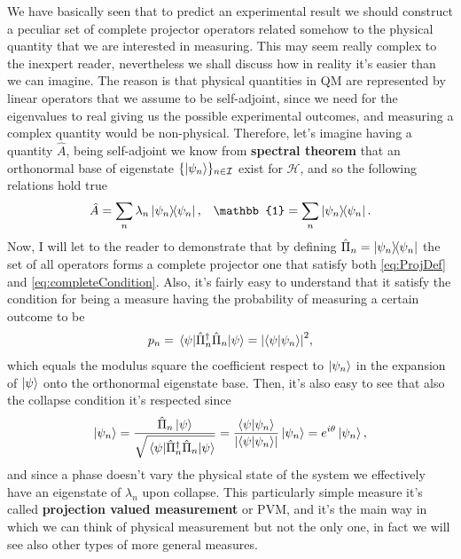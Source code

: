 We have basically seen that to predict an experimental result we should construct a peculiar set of complete projector operators related somehow to the physical quantity that we are interested in measuring. This may seem really complex to the inexpert reader, nevertheless we shall discuss how in reality it's easier than we can imagine. The reason is that physical quantities in QM are represented by linear operators that we assume to be self-adjoint, since we need for the eigenvalues to real giving us the possible experimental outcomes, and measuring a complex quantity would be non-physical. Therefore, let's imagine having a quantity $\hat{A}$, being self-adjoint we know from \textbf{spectral theorem} that an orthonormal base of eigenstate $\{ \ket{\psi_n} \}_{n\in \mathcal{I}}$ exist for $\mathcal{H}$, and so the following relations hold true
\begin{align}
    &\hat{A} = \sum_n \lambda_n\ketbra{\psi_n}{\psi_n}, &\mathbb{1} = \sum_n\ketbra{\psi_n}{\psi_n}.
\end{align}
Now, I will let to the reader to demonstrate that by defining $\hat{\Pi}_n = \ketbra{\psi_n}{\psi_n}$ the set of all operators forms a complete projector one that satisfy both \eqref{eq:ProjDef} and \eqref{eq:completeCondition}. Also, it's fairly easy to understand that it satisfy the condition for being a measure having the probability of measuring a certain outcome to be
\begin{align}
    p_n = \ev{\hat{\Pi}^\dagger_n\hat{\Pi}_n}{\psi} = \abs{\braket{\psi}{\psi_n}}^2,
\end{align}
which equals the modulus square the coefficient respect to $\ket{\psi_n}$ in the expansion of $\ket{\psi}$ onto the orthonormal eigenstate base. Then, it's also easy to see that also the collapse condition it's respected since
\begin{equation}
    \ket{\psi_n} = \frac{\hat{\Pi}_n\ket{\psi}}{\sqrt{\ev{\hat{\Pi}^\dagger_n\hat{\Pi}_n}{\psi}}} = \frac{\braket{\psi}{\psi_n}}{\abs{\braket{\psi}{\psi_n}}}\ket{\psi_n} = e^{i\theta}\ket{\psi_n},
\end{equation}
and since a phase doesn't vary the physical state of the system we effectively have an eigenstate of $\lambda_n$ upon collapse. This particularly simple measure it's called \textbf{projection valued measurement} or PVM, and it's the main way in which we can think of physical measurement but not the only one, in fact we will see also other types of more general measures.

